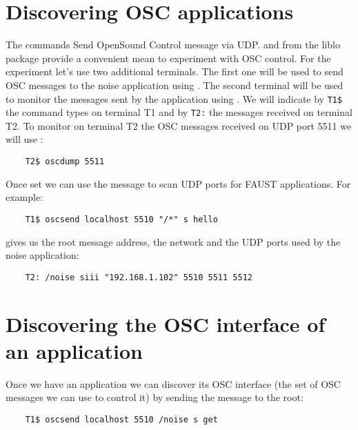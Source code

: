 \section{Discovering OSC applications}

The commands 
Send OpenSound Control message via UDP. and  from the liblo package provide a convenient mean to experiment with OSC control. For the experiment let's use two additional terminals. The first one will be used to send OSC messages to the noise application using . The second terminal will be used to monitor the messages sent by the application using . We will indicate by \lstinline'T1$' the command types on terminal T1 and by \lstinline'T2:' the messages received on terminal T2. To monitor on terminal T2 the OSC messages received on UDP port 5511 we will use :
\begin{lstlisting}
	T2$ oscdump 5511
\end{lstlisting}


Once set we can use the  message  to scan UDP ports for FAUST applications. For example:
\begin{lstlisting}
	T1$ oscsend localhost 5510 "/*" s hello
\end{lstlisting}

gives us the root message address, the network and the UDP ports used by the noise application:
\begin{lstlisting}
	T2: /noise siii "192.168.1.102" 5510 5511 5512
\end{lstlisting}


\section{Discovering the OSC interface of an application}

Once we have an application we can discover its OSC interface (the set of OSC messages we can use to control it) by sending the  message to the root:
\begin{lstlisting}
	T1$ oscsend localhost 5510 /noise s get 
\end{lstlisting}

